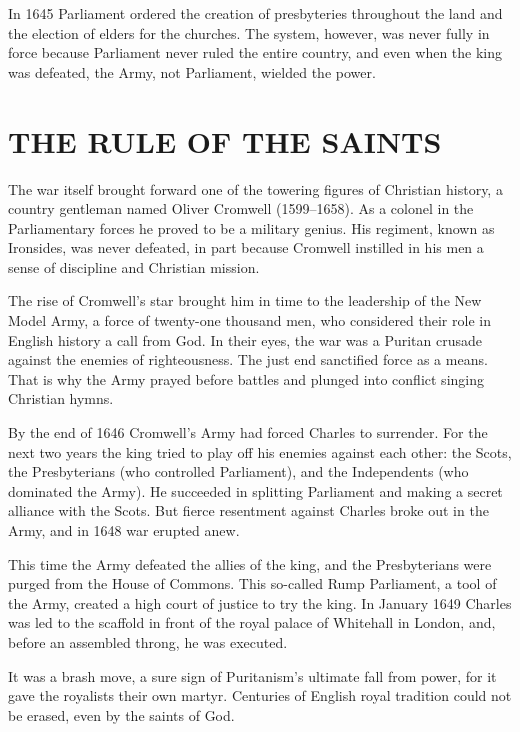 In 1645 Parliament ordered the creation of presbyteries throughout the land and the election of
elders for the churches. The system, however, was never fully in force because Parliament never
ruled the entire country, and even when the king was defeated, the Army, not Parliament, wielded the
power.

\section{THE RULE OF THE SAINTS}

The war itself brought forward one of the towering figures of Christian history, a country gentleman
named Oliver Cromwell (1599–1658). As a colonel in the Parliamentary forces he proved to be a
military genius. His regiment, known as Ironsides, was never defeated, in part because Cromwell
instilled in his men a sense of discipline and Christian mission.

The rise of Cromwell’s star brought him in time to the leadership of the New Model Army, a force of
twenty-one thousand men, who considered their role in English history a call from God. In their
eyes, the war was a Puritan crusade against the enemies of righteousness. The just end sanctified
force as a means. That is why the Army prayed before battles and plunged into conflict singing
Christian hymns.

By the end of 1646 Cromwell’s Army had forced Charles to surrender. For the next two years the king
tried to play off his enemies against each other: the Scots, the Presbyterians (who controlled
Parliament), and the Independents (who dominated the Army). He succeeded in splitting Parliament and
making a secret alliance with the Scots. But fierce resentment against Charles broke out in the
Army, and in 1648 war erupted anew.

This time the Army defeated the allies of the king, and the Presbyterians were purged from the House
of Commons. This so-called Rump Parliament, a tool of the Army, created a high court of justice to
try the king. In January 1649 Charles was led to the scaffold in front of the royal palace of
Whitehall in London, and, before an assembled throng, he was executed.

It was a brash move, a sure sign of Puritanism’s ultimate fall from power, for it gave the royalists
their own martyr. Centuries of English royal tradition could not be erased, even by the saints of
God.


